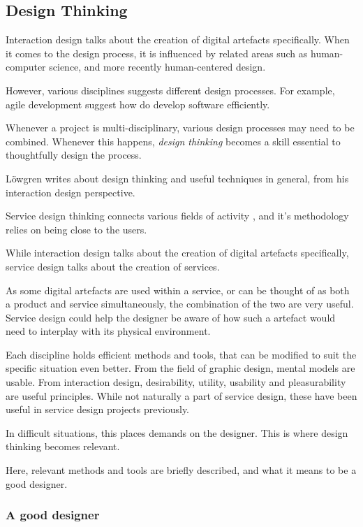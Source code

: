 \subsection{Design Thinking}

%

Interaction design talks about the creation of digital artefacts specifically. When it comes to the design process, it is influenced by related areas such as human-computer science, and more recently human-centered design.

However, various disciplines suggests different design processes. For example, agile development suggest how do develop software efficiently.

Whenever a project is multi-disciplinary, various design processes may need to be combined. Whenever this happens, \textit{design thinking} becomes a skill essential to thoughtfully design the process.

Löwgren \cite{lowgren} writes about design thinking and useful techniques in general, from his interaction design perspective.

Service design thinking connects various fields of activity \cite{stickdorn}, and it's methodology relies on being close to the users.

While interaction design talks about the creation of digital artefacts specifically, service design talks about the creation of services.

As some digital artefacts are used within a service, or can be thought of as both a product and service simultaneously, the combination of the two are very useful. Service design could help the designer be aware of how such a artefact would need to interplay with its physical environment.

Each discipline holds efficient methods and tools, that can be modified to suit the specific situation even better. From the field of graphic design, mental models are usable. From interaction design, desirability, utility, usability and pleasurability are useful principles. While not naturally a part of service design, these have been useful in service design projects previously. \cite{stickdorn}

In difficult situations, this places demands on the designer. This is where design thinking becomes relevant.

Here, relevant methods and tools are briefly described, and what it means to be a good designer.

\subsubsection{A good designer}

